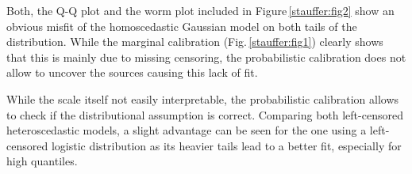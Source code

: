 \documentclass[twoside]{report}
\begin{document}
Both, the Q-Q plot and the worm plot included in Figure\,\ref{stauffer:fig2} show an
obvious misfit of the homoscedastic Gaussian model on both tails of the
distribution. While the marginal calibration (Fig.\,\ref{stauffer:fig1})
clearly shows that this is mainly due to missing censoring, the probabilistic
calibration does not allow to uncover the sources causing this lack of fit.

While the scale itself not easily interpretable, the probabilistic calibration
allows to check if the distributional assumption is correct.  Comparing both
left-censored heteroscedastic models, a slight advantage can be seen for the
one using a left-censored logistic distribution as its heavier tails lead to a
better fit, especially for high quantiles.




%



\end{document}
